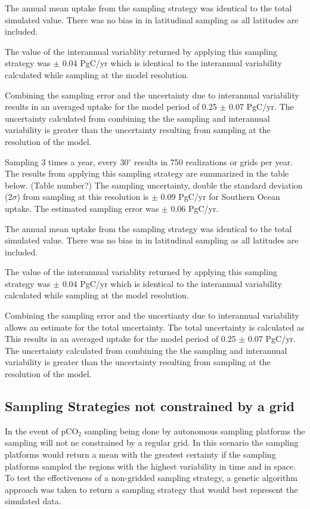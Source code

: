 \documentclass[11pt, a4paper]{article}
\numberwithin{figure}{section}
\numberwithin{table}{section}
\begin{document}
The annual mean uptake from the sampling strategy was identical to 
the total simulated value. There was no bias in in latitudinal sampling
as all latitudes are included.

The value of the interannual variablity returned by applying this
sampling strategy was $\pm$ 0.04 PgC/yr which is identical to the 
interannual variability calculated while sampling at the model 
resolution. 

Combining the sampling error and the uncertainty due to interannual
variability results in an averaged uptake for the model period of 
0.25 $\pm$ 0.07 PgC/yr.
The uncertainty calculated from combining the the sampling and 
interannual variability is greater than the uncertainty resulting from
sampling at the resolution of the model.


Sampling 3 times a year, every 30$^{\circ}$ results in 750 realizations 
or grids per year. The results from applying this sampling strategy are
summarized in the table below. (Table number?)
The sampling uncertainty, double the standard deviation (2$\sigma$) 
from sampling at this resolution is
$\pm$ 0.09 PgC/yr for Southern Ocean uptake.
The estimated sampling error was 
$\pm$ 0.06 PgC/yr. %

The annual mean uptake from the sampling strategy was identical to 
the total simulated value. There was no bias in in latitudinal sampling
as all latitudes are included.

The value of the interannual variablity returned by applying this
sampling strategy was $\pm$ 0.04 PgC/yr which is identical to the 
interannual variability calculated while sampling at the model 
resolution. 

Combining the sampling error and the uncertianty due to interannual
variability allows an estimate for the total uncertainty. The total
uncertainty is calculated as 
This results in an averaged uptake for the model period of 
0.25 $\pm$ 0.07 PgC/yr.
The uncertainty calculated from combining the the sampling and 
interannual variability is greater than the uncertainty resulting from
sampling at the resolution of the model.

\subsection{Sampling Strategies not constrained by a grid}
In the event of pCO$_2$ sampling being done by autonomous sampling platforms
the sampling will not ne constrained by a regular grid. In this scenario the
sampling platforms would return a mean with the greatest certainty if the 
sampling platforms sampled the regions with the highest variability in time and in space.
To test the effectiveness of a non-gridded sampling strategy, a genetic algorithm approach 
was taken to return a sampling strategy that would best represent the simulated data.	
\end{document}
